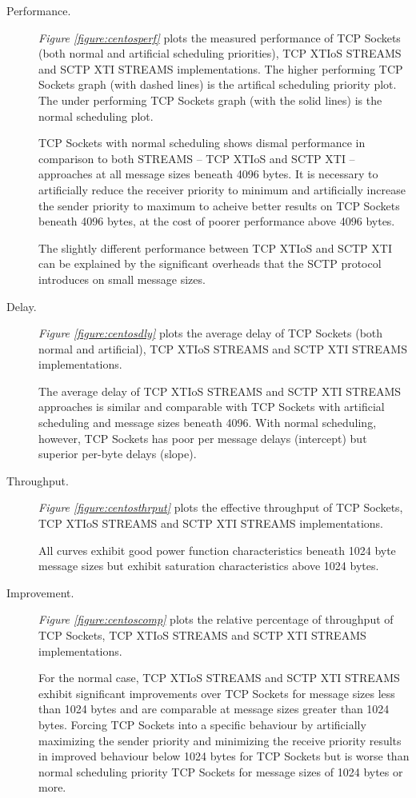 \documentclass[letterpaper,final,notitlepage,twocolumn,10pt,twoside]{article}
\begin{document}
\begin{description}

\item[Performance.]

\textit{Figure \ref{figure:centosperf}}
plots the measured performance of TCP Sockets (both normal and artificial scheduling priorities),
TCP XTIoS STREAMS and SCTP XTI STREAMS implementations.
The higher performing TCP Sockets graph (with dashed lines) is the artifical scheduling priority
plot.  The under performing TCP Sockets graph (with the solid lines) is the normal scheduling plot.

TCP Sockets with normal scheduling shows dismal performance in comparison to both STREAMS -- TCP
XTIoS and SCTP XTI -- approaches at all message sizes beneath 4096 bytes.  It is necessary to
artificially reduce the receiver priority to minimum and artificially increase the sender priority
to maximum to acheive better results on TCP Sockets beneath 4096 bytes, at the cost of poorer
performance above 4096 bytes.

The slightly different performance between TCP XTIoS and SCTP XTI can be explained by the
significant overheads that the SCTP protocol introduces on small message sizes.

\item[Delay.]

\textit{Figure \ref{figure:centosdly}}
plots the average delay of TCP Sockets (both normal and artificial), TCP XTIoS STREAMS and SCTP XTI
STREAMS implementations.

The average delay of TCP XTIoS STREAMS and SCTP XTI STREAMS approaches is similar and comparable
with TCP Sockets with artificial scheduling and message sizes beneath 4096.  With normal scheduling,
however, TCP Sockets has poor per message delays (intercept) but superior per-byte delays (slope).

\item[Throughput.]

\textit{Figure \ref{figure:centosthrput}}
plots the effective throughput of TCP Sockets, TCP XTIoS STREAMS and SCTP XTI STREAMS
implementations.

All curves exhibit good power function characteristics beneath 1024 byte  message sizes but exhibit
saturation characteristics above 1024 bytes.

\item[Improvement.]

\textit{Figure \ref{figure:centoscomp}}
plots the relative percentage of throughput of TCP Sockets, TCP XTIoS STREAMS and SCTP XTI STREAMS
implementations.

For the normal case, TCP XTIoS STREAMS and SCTP XTI STREAMS exhibit significant improvements over
TCP Sockets for message sizes less than 1024 bytes and are comparable  at message sizes greater than
1024 bytes.  Forcing TCP Sockets into a specific behaviour by artificially maximizing the sender
priority and minimizing the receive priority results in improved behaviour below 1024 bytes for TCP
Sockets but is worse than normal scheduling priority TCP Sockets for message sizes of 1024 bytes or
more.

\end{description}
\end{document}
